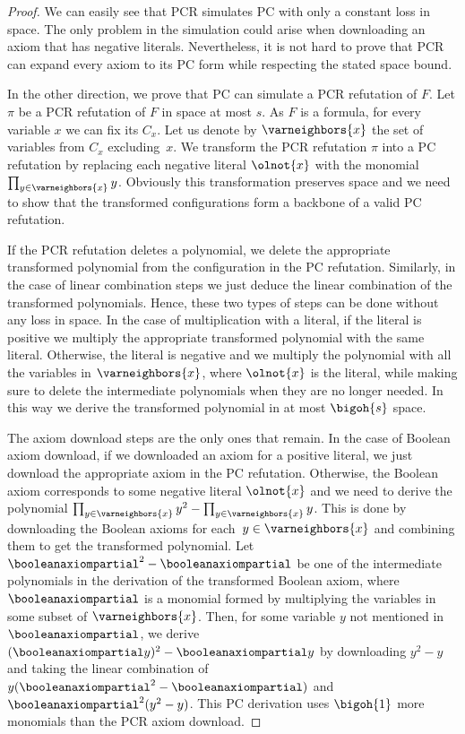 \begin{proof}
  We can easily see that PCR simulates PC with only a constant loss in
  space. The only problem in the simulation could arise when
  downloading an axiom that has negative literals. Nevertheless, it is
  not hard to prove that PCR can expand every axiom to its PC form
  while respecting the stated space bound.

  In the other direction, we prove that PC can simulate a PCR
  refutation of $F$. Let $\pi$ be a PCR refutation of $F$ in space at
  most $s$. As $F$ is a \varweightconstrained{} formula, for every
  variable $x$ we can fix its  $C_x$. Let us
  denote by $\varneighbors{x}$ the set of variables from $C_x$
  excluding~$x$. We transform the PCR refutation $\pi$ into a PC
  refutation by replacing each negative literal $\olnot{x}$ with the
  monomial $\prod_{y \in \varneighbors{x}} y$. Obviously this
  transformation preserves space and we need to show that the
  transformed configurations form a backbone of a valid PC refutation.

  If the PCR refutation deletes a polynomial, we delete the
  appropriate transformed polynomial from the configuration in the
  PC refutation. Similarly, in the case of linear combination steps we
  just deduce the linear combination of the transformed
  polynomials. Hence, these two types of steps can be done without any
  loss in space. In the case of multiplication with a literal, if the
  literal is positive we multiply the appropriate transformed
  polynomial with the same literal. Otherwise, the literal is negative
  and we multiply the polynomial with all the variables in
  $\varneighbors{x}$, where $\olnot{x}$ is the literal, while making
  sure to delete the intermediate polynomials when they are no longer
  needed. In this way we derive the transformed polynomial in at most
  $\bigoh{s}$ space.

  The axiom download steps are the only ones that remain. In the case
  of Boolean axiom download, if we downloaded an axiom for a positive
  literal, we just download the appropriate axiom in the PC
  refutation. Otherwise, the Boolean axiom corresponds to some
  negative literal $\olnot{x}$ and we need to derive the polynomial
  $\prod_{y \in \varneighbors{x}} y^2 - \prod_{y \in \varneighbors{x}}
  y$. This is done by downloading the Boolean axioms for each~$y \in
  \varneighbors{x}$ and combining them to get the transformed
  polynomial. Let $\booleanaxiompartial^2 - \booleanaxiompartial$ be
  one of the intermediate polynomials in the derivation of the
  transformed Boolean axiom, where $\booleanaxiompartial$ is a
  monomial formed by multiplying the variables in some subset of
  $\varneighbors{x}$. Then, for some variable $y$ not mentioned in
  $\booleanaxiompartial$, we derive $(\booleanaxiompartial y)^2 -
  \booleanaxiompartial y$ by downloading $y^2 - y$ and taking the
  linear combination of $y(\booleanaxiompartial^2 -
  \booleanaxiompartial)$ and $\booleanaxiompartial^2(y^2 - y)$. This
  PC derivation uses $\bigoh{1}$ more monomials than the PCR axiom
  download.


\end{proof}
